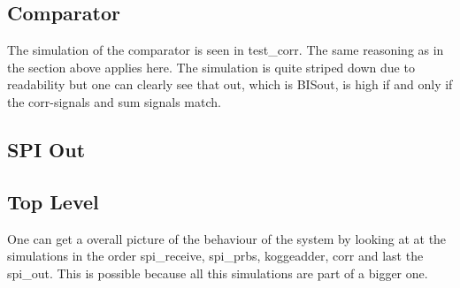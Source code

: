 \subsection{Comparator}
The simulation of the comparator is seen in test\_corr. The same reasoning as in the section above applies here. The simulation is quite striped down due to readability but one can clearly see that out, which is BISout, is high if and only if the corr-signals and sum signals match.

\subsection{SPI Out}

\subsection{Top Level}
One can get a overall picture of the behaviour of the system by looking at at the simulations in the order spi\_receive, spi\_prbs, koggeadder, corr and last the spi\_out. This is possible because all this simulations are part of a bigger one.
